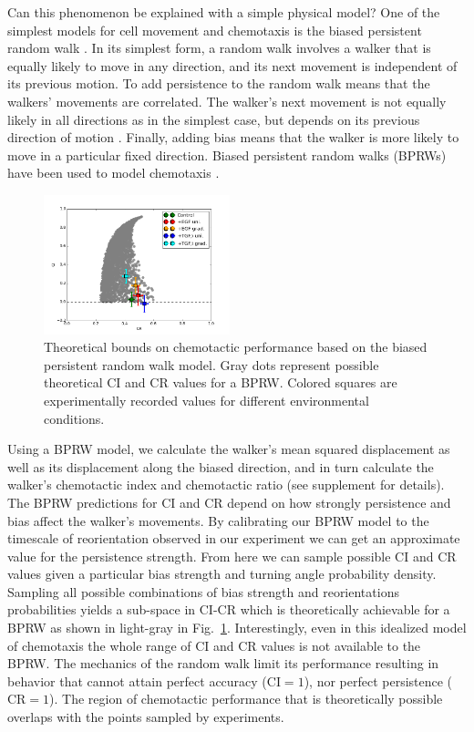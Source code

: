 Can this phenomenon be explained with a simple physical model? One of the simplest models for cell movement and chemotaxis is the biased persistent random walk \cite{alt1980biased,othmer1988models}. In its simplest form, a random walk involves a walker that is equally likely to move in any direction, and its next movement is independent of its previous motion. To add persistence to the random walk means that the walkers' movements are correlated. The walker's next movement is not equally likely in all directions as in the simplest case, but depends on its previous direction of motion \cite{patlak1953random}. Finally, adding bias means that the walker is more likely to move in a particular fixed direction.
Biased persistent random walks (BPRWs) have been used to model chemotaxis \cite{alt1980biased,othmer1988models}.

\begin{figure}
    \centering
    \includegraphics[width=0.48\textwidth]{../fig/ch2_fig4.png}
    \caption{Theoretical bounds on chemotactic performance based on the biased persistent random walk model. Gray dots represent possible theoretical CI and CR values for a BPRW. Colored squares are experimentally recorded values for different environmental conditions.} \label{fig:ch2_4}
\end{figure}

Using a BPRW model, we calculate the walker's mean squared displacement as well as its displacement along the biased direction, and in turn calculate the walker's chemotactic index and chemotactic ratio (see supplement for details). The BPRW predictions for CI and CR depend on how strongly persistence and bias affect the walker's movements. By calibrating our BPRW model to the timescale of reorientation observed in our experiment we can get an approximate value for the persistence strength. From here we can sample possible CI and CR values given a particular bias strength and turning angle probability density. Sampling all possible combinations of bias strength and reorientations probabilities yields a sub-space in CI-CR which is theoretically achievable for a BPRW as shown in light-gray in Fig.\ \ref{fig:ch2_4}. Interestingly, even in this idealized model of chemotaxis the whole range of CI and CR values is not available to the BPRW.
The mechanics of the random walk limit its performance resulting in behavior that cannot attain perfect accuracy ($\text{CI}=1$), nor perfect persistence ($\text{CR}=1$).
The region of chemotactic performance that is theoretically possible overlaps with the points sampled by experiments.

